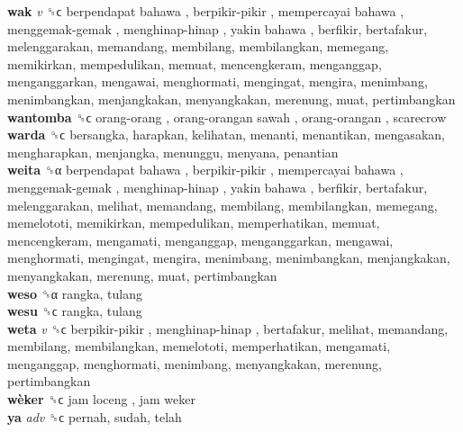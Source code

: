 \textbf{wak} \emph{v}  ␝ϲ   berpendapat bahawa ,  berpikir-pikir ,  mempercayai bahawa ,  menggemak-gemak ,  menghinap-hinap ,  yakin bahawa , berfikir, bertafakur, melenggarakan, memandang, membilang, membilangkan, memegang, memikirkan, mempedulikan, memuat, mencengkeram, menganggap, menganggarkan, mengawai, menghormati, mengingat, mengira, menimbang, menimbangkan, menjangkakan, menyangkakan, merenung, muat, pertimbangkan  \\
\textbf{wantomba} ␝ϲ   orang-orang ,  orang-orangan sawah ,  orang-orangan , scarecrow  \\
\textbf{warda} ␝ϲ  bersangka, harapkan, kelihatan, menanti, menantikan, mengasakan, mengharapkan, menjangka, menunggu, menyana, penantian  \\
\textbf{weita} ␝α   berpendapat bahawa ,  berpikir-pikir ,  mempercayai bahawa ,  menggemak-gemak ,  menghinap-hinap ,  yakin bahawa , berfikir, bertafakur, melenggarakan, melihat, memandang, membilang, membilangkan, memegang, memelototi, memikirkan, mempedulikan, memperhatikan, memuat, mencengkeram, mengamati, menganggap, menganggarkan, mengawai, menghormati, mengingat, mengira, menimbang, menimbangkan, menjangkakan, menyangkakan, merenung, muat, pertimbangkan  \\
\textbf{weso} ␝α  rangka, tulang  \\
\textbf{wesu} ␝ϲ  rangka, tulang  \\
\textbf{weta} \emph{v}  ␝ϲ   berpikir-pikir ,  menghinap-hinap , bertafakur, melihat, memandang, membilang, membilangkan, memelototi, memperhatikan, mengamati, menganggap, menghormati, menimbang, menyangkakan, merenung, pertimbangkan  \\
\textbf{wèker} ␝ϲ   jam loceng ,  jam weker   \\
\textbf{ya} \emph{adv}  ␝ϲ  pernah, sudah, telah  \\

